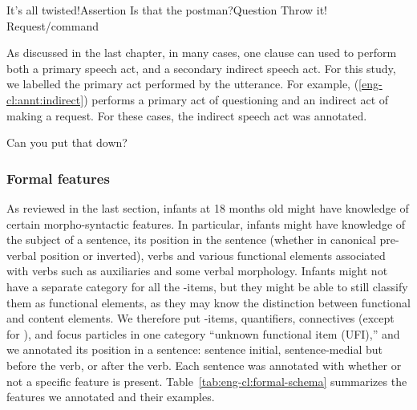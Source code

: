 \bxl{} It’s all twisted!\hfill	Assertion
\ex Is that the postman?\hfill		Question
\ex Throw it!	\hfill		Request/command
\exl
\eex

As discussed in the last chapter, in many cases, one clause can used to perform both a primary speech act, and a secondary indirect speech act. For this study, we labelled the primary act performed by the utterance. For example, (\ref{eng-cl:annt:indirect}) performs a primary act of questioning and an indirect act of making a request. For these cases, the indirect speech act was annotated.

Can you put that down?
\eex 

\subsubsection{Formal features}

As reviewed in the last section, infants at 18 months old might have knowledge of certain morpho-syntactic features. In particular, infants might have knowledge of the subject of a sentence, its position in the sentence (whether in canonical pre-verbal position or inverted), verbs and various functional elements associated with verbs such as auxiliaries and some verbal morphology. Infants might not have a separate category for all the \twh-items, but they might be able to still classify them as functional elements, as they may know the distinction between functional and content elements. We therefore put \twh-items, quantifiers, connectives (except for ), and focus particles in one category ``unknown functional item (UFI),'' and we annotated its position in a sentence: sentence initial, sentence-medial but before the verb, or after the verb. Each sentence was annotated with whether or not a specific feature is present. Table~\ref{tab:eng-cl:formal-schema} summarizes the features we annotated and their examples.  


